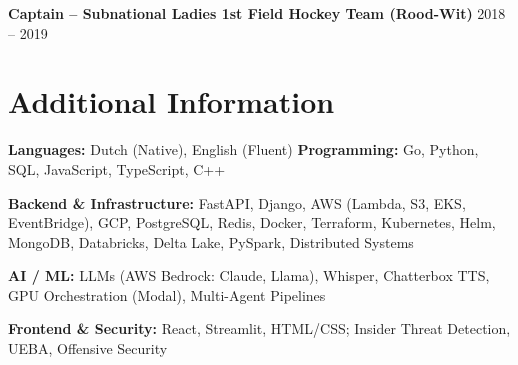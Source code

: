 \documentclass[9pt,letterpaper]{article}
\begin{document}
\textbf{Captain -- Subnational Ladies 1st Field Hockey Team (Rood-Wit)} \hfill 2018 -- 2019
\section{Additional Information}
\textbf{Languages:} Dutch (Native), English (Fluent) \hfill \textbf{Programming:} Go, Python, SQL, JavaScript, TypeScript, C++
\vspace{1pt}

\textbf{Backend \& Infrastructure:} FastAPI, Django, AWS (Lambda, S3, EKS, EventBridge), GCP, PostgreSQL, Redis, Docker, Terraform, Kubernetes, Helm, MongoDB, Databricks, Delta Lake, PySpark, Distributed Systems
\vspace{1pt}

\textbf{AI / ML:} LLMs (AWS Bedrock: Claude, Llama), Whisper, Chatterbox TTS, GPU Orchestration (Modal), Multi-Agent Pipelines
\vspace{1pt}

\textbf{Frontend \& Security:} React, Streamlit, HTML/CSS; Insider Threat Detection, UEBA, Offensive Security
\end{document}
